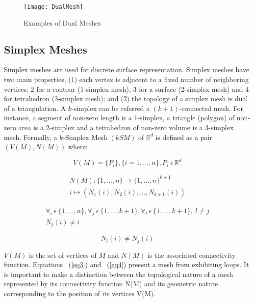 \documentclass{InsightArticle}
\begin{document}
\begin{figure}[!b]
	\centering
	\texttt{[image: DualMesh]}
	\caption{Examples of Dual Meshes}
	\label{fig:dualMeshes}
\end{figure}

\subsection{Simplex Meshes}

Simplex meshes are used for discrete surface representation. Simplex meshes have two main properties, (1) each vertex is adjacent to a fixed number of neighboring vertices: 2 for a contour (1-simplex mesh), 3 for a surface (2-simplex mesh) and 4 for tetrahedron (3-simplex mesh); and (2) the topology of a simplex mesh is dual of a triangulation. A $k$-simplex can be referred a $(k+1)$-connected mesh. For instance, a segment of non-zero length is a 1-simplex, a triangle (polygon) of non-zero area is a 2-simplex and a tetrahedron of non-zero volume is a 3-simplex mesh. Formally, a $k$-Simplex Mesh $(kSM)$ of $\mathbb{R}^d$ is defined as a pair $(V(M), N(M))$ \cite{Delingette1994} where:

\begin{equation}
	V(M) = \{P_i\}, \{i = 1,..., n\}, P_i\  \epsilon\  \mathbb{R}^d
	\label{eq1}
\end{equation}

\begin{equation}
	\begin{array}{c}
		N(M) : \{1,...,n\} \longrightarrow \{1,...,n\}^{k+1} \\
		i \longmapsto (N_1 (i), N_2 (i),...,N_{k+1} (i))
	\end{array}
	\label{eq2}
\end{equation}

\begin{equation}
	\begin{array}{c}
		\forall _i \ \epsilon \ \{1,...,n\}, \forall _j \ \epsilon \ \{1,...,k+1\}, \forall _l \ \epsilon \ \{1,...,k+1\}, \ l \neq j \\
		N_j (i) \neq i
	\end{array}
	\label{eq3}
\end{equation}

\begin{equation}
	N_l (i) \neq N_j (i)
	\label{eq4}
\end{equation}

$V(M)$ is the set of vertices of $M$ and $N(M)$ is the associated connectivity function. Equations ~(\ref{eq3}) and ~(\ref{eq4}) present a mesh from exhibiting loops. It is important to make a distinction between the topological nature of a mesh represented by its connectivity function N(M) and its geometric nature corresponding to the position of its vertices V(M). 
\end{document}
